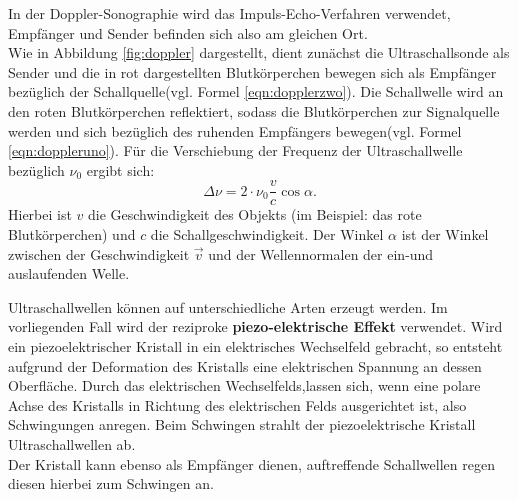 In der Doppler-Sonographie wird das Impuls-Echo-Verfahren verwendet, Empfänger und Sender befinden sich also am gleichen Ort.\\
Wie in Abbildung \ref{fig:doppler} dargestellt, dient zunächst die Ultraschallsonde als Sender und die in rot dargestellten Blutkörperchen bewegen sich als Empfänger bezüglich der Schallquelle(vgl. Formel \eqref{eqn:dopplerzwo}). Die Schallwelle wird an den roten Blutkörperchen reflektiert, sodass die Blutkörperchen zur Signalquelle werden und sich bezüglich des ruhenden Empfängers bewegen(vgl. Formel \eqref{eqn:doppleruno}).
Für die Verschiebung der Frequenz der Ultraschallwelle bezüglich $\nu_0$ ergibt sich:
\begin{equation}
  \label{eqn:verschiebung}
  \Delta \nu=2\cdot\nu_0\frac{v}{c}\cos{\alpha} \text{.}
\end{equation}
Hierbei ist $v$ die Geschwindigkeit des Objekts (im Beispiel: das rote Blutkörperchen) und $c$ die Schallgeschwindigkeit.
Der Winkel $\alpha$ ist der Winkel zwischen der Geschwindigkeit $\vec{v}$ und der Wellennormalen der ein-und auslaufenden Welle.

Ultraschallwellen können auf unterschiedliche Arten erzeugt werden. Im vorliegenden Fall wird der reziproke \textbf{piezo-elektrische Effekt} verwendet.
Wird ein piezoelektrischer Kristall in ein elektrisches Wechselfeld gebracht, so entsteht aufgrund der Deformation des Kristalls eine elektrischen Spannung an dessen Oberfläche. Durch das elektrischen Wechselfelds,lassen sich, wenn eine polare Achse des Kristalls in Richtung des elektrischen Felds ausgerichtet ist, also Schwingungen anregen.
Beim Schwingen strahlt der piezoelektrische Kristall Ultraschallwellen ab.\\
Der Kristall kann ebenso als Empfänger dienen, auftreffende Schallwellen regen diesen hierbei zum Schwingen an.
